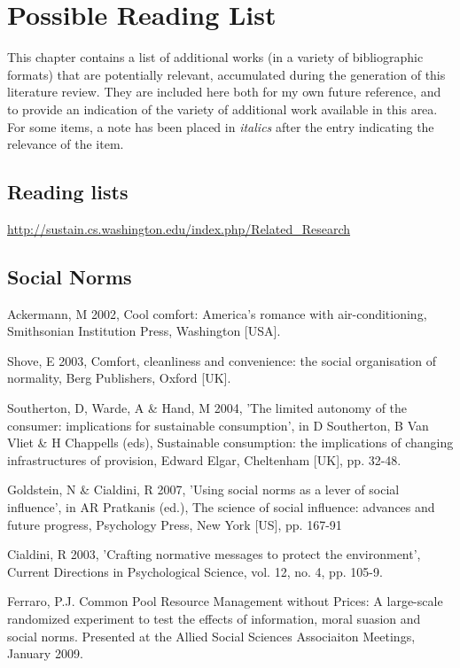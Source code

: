 \chapter{Possible Reading List}
This chapter contains a list of additional works (in a variety of bibliographic formats) that are potentially relevant, accumulated during the generation of this literature review. They are included here both for my own future reference, and to provide an indication of the variety of additional work available in this area. For some items, a note has been placed in \emph{italics} after the entry indicating the relevance of the item.

\section{Reading lists}

\url{http://sustain.cs.washington.edu/index.php/Related_Research}


\section{Social Norms}
Ackermann, M 2002, Cool comfort: America's romance with air-conditioning, Smithsonian Institution Press, Washington [USA].

Shove, E 2003, Comfort, cleanliness and convenience: the social organisation of normality, Berg Publishers, Oxford [UK].

Southerton, D, Warde, A \& Hand, M 2004, 'The limited autonomy of the consumer: implications for sustainable consumption', in D Southerton, B Van Vliet \& H Chappells (eds), Sustainable consumption: the implications of changing infrastructures of provision, Edward Elgar, Cheltenham [UK], pp. 32-48.

Goldstein, N \& Cialdini, R 2007, 'Using social norms as a lever of social influence', in AR Pratkanis (ed.), The science of social influence: advances and future progress, Psychology Press, New York [US], pp. 167-91

Cialdini, R 2003, 'Crafting normative messages to protect the environment', Current Directions in Psychological Science, vol. 12, no. 4, pp. 105-9.

Ferraro, P.J. Common Pool Resource Management without Prices:  A large-scale randomized experiment to test the effects of information, moral suasion and social norms. Presented at the Allied Social Sciences Associaiton Meetings, January 2009.











